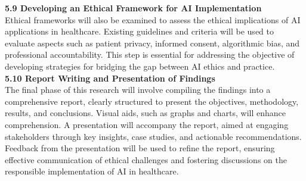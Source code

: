 \documentclass[a4paper, 12pt]{article}
\begin{document}
\textbf{5.9 \hspace{5mm} Developing an Ethical Framework for AI Implementation}\\
Ethical frameworks will also be examined to assess the ethical implications of AI applications in healthcare. Existing guidelines and criteria will be used to evaluate aspects such as patient privacy, informed consent, algorithmic bias, and professional accountability. This step is essential for addressing the objective of developing strategies for bridging the gap between AI ethics and practice.\\

\textbf{5.10 \hspace{5mm} Report Writing and Presentation of Findings}\\
The final phase of this research will involve compiling the findings into a comprehensive report, clearly structured to present the objectives, methodology, results, and conclusions. Visual aids, such as graphs and charts, will enhance comprehension. A presentation will accompany the report, aimed at engaging stakeholders through key insights, case studies, and actionable recommendations. Feedback from the presentation will be used to refine the report, ensuring effective communication of ethical challenges and fostering discussions on the responsible implementation of AI in healthcare.


\end{document}
